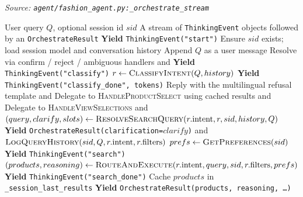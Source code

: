 \begin{algorithm}[H]
\caption{Direct Routing Orchestration (Streaming)}\label{alg:routing}
\textit{Source: \texttt{agent/fashion\_agent.py:\_orchestrate\_stream}}
\begin{algorithmic}[1]
\Require User query $Q$, optional session id $sid$
\Ensure A stream of \texttt{ThinkingEvent} objects followed by an \texttt{OrchestrateResult}
    \State \textbf{Yield} \texttt{ThinkingEvent("start")}
    \State Ensure $sid$ exists; load session model and conversation history
    \State Append $Q$ as a user message
        \State Resolve via confirm / reject / ambiguous handlers and \Return
    \EndIf
    \State \textbf{Yield} \texttt{ThinkingEvent("classify")}
    \State $r \gets \textsc{ClassifyIntent}(Q, history)$ 
    \State \textbf{Yield} \texttt{ThinkingEvent("classify\_done", tokens)}
        \State Reply with the multilingual refusal template and \Return
        \State Delegate to \textsc{HandleProductSelect} using cached results and \Return
        \State Delegate to \textsc{HandleViewSelections} and \Return
    \EndIf
    \State $(query, clarify, slots) \gets \textsc{ResolveSearchQuery}(r.\text{intent}, r, sid, history, Q)$
        \State \textbf{Yield} \texttt{OrchestrateResult(clarification=$clarify$)} and \Return
    \EndIf
    \State $\textsc{LogQueryHistory}(sid, Q, r.\text{intent}, r.\text{filters})$ 
    \State $prefs \gets \textsc{GetPreferences}(sid)$ 
    \State \textbf{Yield} \texttt{ThinkingEvent("search")}
    \State $(products, reasoning) \gets \textsc{RouteAndExecute}(r.\text{intent}, query, sid, r.\text{filters}, prefs)$
    \State \textbf{Yield} \texttt{ThinkingEvent("search\_done")}
    \State Cache $products$ in \texttt{\_session\_last\_results}
    \State \textbf{Yield} \texttt{OrchestrateResult(products, reasoning, \ldots)}
\EndProcedure
\end{algorithmic}
\end{algorithm}

